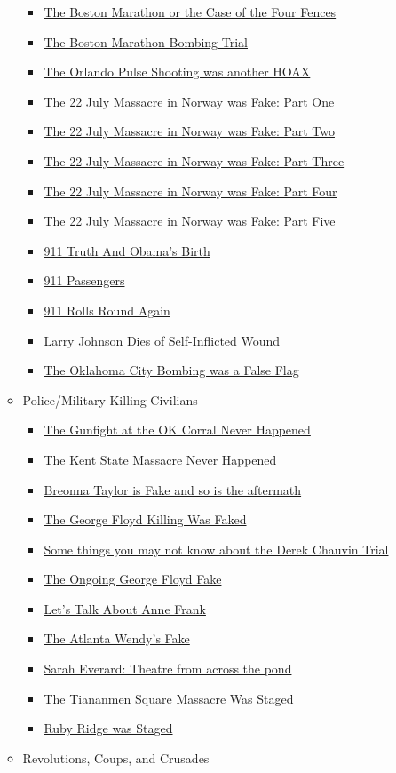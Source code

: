\documentclass{article}
\newcommand{\insertmydocument}[2]{ %
  \item \href{http://www.mileswmathis.com/#2}{#1}
}
\begin{document}
\begin{itemize}
\begin{itemize}
\begin{itemize}
      \insertmydocument{The Boston Marathon or the Case of the Four Fences}{boston.pdf}
      \insertmydocument{The Boston Marathon Bombing Trial}{boston2.pdf}
      \insertmydocument{The Orlando Pulse Shooting was another HOAX}{orlan.pdf}
      \insertmydocument{The 22 July Massacre in Norway was Fake: Part One}{happy.pdf}
      \insertmydocument{The 22 July Massacre in Norway was Fake: Part Two}{blob3.pdf}
      \insertmydocument{The 22 July Massacre in Norway was Fake: Part Three}{oslo.pdf}
      \insertmydocument{The 22 July Massacre in Norway was Fake: Part Four}{ole.pdf}
      \insertmydocument{The 22 July Massacre in Norway was Fake: Part Five}{part5.pdf}
      \insertmydocument{911 Truth And Obama's Birth}{strike.pdf}
      \insertmydocument{911 Passengers}{pass.pdf}
      \insertmydocument{911 Rolls Round Again}{mcilvaine.pdf}
      \insertmydocument{Larry Johnson Dies of Self-Inflicted Wound}{shroyer.pdf}
      \insertmydocument{The Oklahoma City Bombing was a False Flag}{okcb.pdf}
    \end{itemize}

    \item Police/Military Killing Civilians
    \begin{itemize}

      \insertmydocument{The Gunfight at the OK Corral Never Happened}{ok.pdf}
      \insertmydocument{The Kent State Massacre Never Happened}{kent.pdf}
      \insertmydocument{Breonna Taylor is Fake and so is the aftermath}{breonna.pdf}
      \insertmydocument{The George Floyd Killing Was Faked}{floyd.pdf}
      \insertmydocument{Some things you may not know about the Derek Chauvin Trial}{chauvin.pdf}
      \insertmydocument{The Ongoing George Floyd Fake}{chauvin3.pdf}
      \insertmydocument{Let’s Talk About Anne Frank}{frank.pdf}
      \insertmydocument{The Atlanta Wendy's Fake}{wendy.pdf}
      \insertmydocument{Sarah Everard: Theatre from across the pond}{everard.pdf}
      \insertmydocument{The Tiananmen Square Massacre Was Staged}{tian.pdf}
      \insertmydocument{Ruby Ridge was Staged}{rubyridge.pdf}
    \end{itemize}

    \item Revolutions, Coups, and Crusades
    \begin{itemize}


\end{itemize}
\end{itemize}
\end{itemize}
\end{document}
